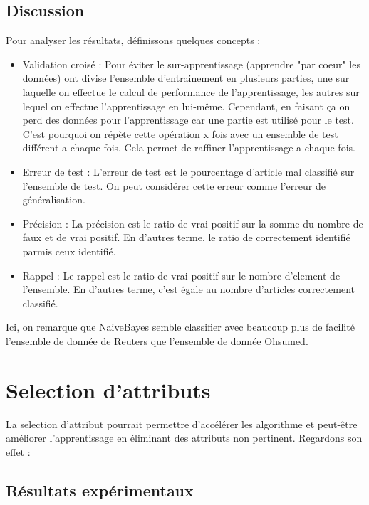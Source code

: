 \documentclass[a4paper,10pt]{article}
\begin{document}
\subsection{Discussion}

Pour analyser les résultats, définissons quelques concepts :
\begin{itemize}
	\item Validation croisé : Pour éviter le sur-apprentissage (apprendre "par coeur" les données) ont divise l'ensemble d'entrainement en plusieurs parties, une sur laquelle on effectue le calcul de performance de l'apprentissage, les autres sur lequel on effectue l'apprentissage en lui-même. Cependant, en faisant ça on perd des données pour l'apprentissage car une partie est utilisé pour le test. C'est pourquoi on répète cette opération x fois avec un ensemble de test différent a chaque fois. Cela permet de raffiner l'apprentissage a chaque fois.
	\item Erreur de test : L'erreur de test est le pourcentage d'article mal classifié sur l'ensemble de test. On peut considérer cette erreur comme l'erreur de généralisation.
	\item Précision : La précision est le ratio de vrai positif sur la somme du nombre de faux et de vrai positif. En d'autres terme, le ratio de correctement identifié parmis ceux identifié.
	\item Rappel : Le rappel est le ratio de vrai positif sur le nombre d'element de l'ensemble. En d'autres terme, c'est égale au nombre d'articles correctement classifié.
\end{itemize}

Ici, on remarque que NaiveBayes semble classifier avec beaucoup plus de facilité l'ensemble de donnée de Reuters que l'ensemble de donnée Ohsumed.


\section{Selection d'attributs}

La selection d'attribut pourrait permettre d'accélérer les algorithme et peut-être améliorer l'apprentissage en éliminant des attributs non pertinent. Regardons son effet :

\subsection{Résultats expérimentaux}
\end{document}
